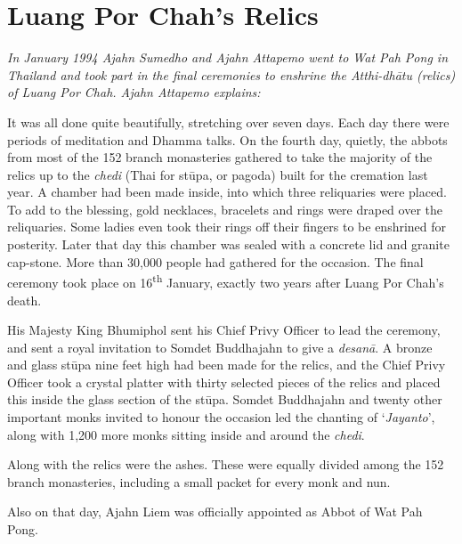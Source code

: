 
\chapter{Luang Por Chah's Relics}

\emph{In January 1994 Ajahn Sumedho and Ajahn Attapemo went to Wat Pah
Pong in Thailand and took part in the final ceremonies to enshrine the
Atthi-dhātu (relics) of Luang Por Chah. Ajahn Attapemo explains:}

It was all done quite beautifully, stretching over seven days. Each day
there were periods of meditation and Dhamma talks. On the fourth day, 
quietly, the abbots from most of the 152 branch monasteries gathered to
take the majority of the relics up to the \emph{chedi} (Thai for stūpa, or
pagoda) built for the cremation last year. A chamber had been made
inside, into which three reliquaries were placed. To add to the
blessing, gold necklaces, bracelets and rings were draped over the
reliquaries. Some ladies even took their rings off their fingers to be
enshrined for posterity. Later that day this chamber was sealed with a
concrete lid and granite cap-stone. More than 30,000 people had gathered
for the occasion. The final ceremony took place on 16\textsuperscript{th} January, exactly
two years after Luang Por Chah's death. 

His Majesty King Bhumiphol sent his Chief Privy Officer to lead the
ceremony, and sent a royal invitation to Somdet Buddhajahn to give a
\emph{desanā}. A bronze and glass stūpa nine feet high had been made for
the relics, and the Chief Privy Officer took a crystal platter with
thirty selected pieces of the relics and placed this inside the glass
section of the stūpa. Somdet Buddhajahn and twenty other important monks
invited to honour the occasion led the chanting of `\emph{Jayanto}', along
with 1,200 more monks sitting inside and around the \emph{chedi}.

Along with the relics were the ashes. These were equally divided among
the 152 branch monasteries, including a small packet for every monk and
nun.

Also on that day, Ajahn Liem was officially appointed as Abbot of Wat
Pah Pong.

